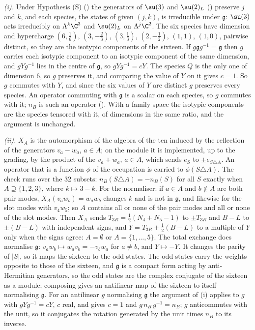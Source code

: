 \emph{(i).} Under Hypothesis (S) () the generators of $\su(3)$ and $\su(2)_{L}$ () preserve $j$ and $k$, and each species, the states of given $(j, k)$, is irreducible under $\mathfrak{g}$: $\su(3)$ acts irreducibly on $\Lambda^{k}\C^{3}$ and $\su(2)_{L}$ on $\Lambda^{j}\C^{2}$. The six species have dimension and hypercharge $(6, \tfrac16)$, $(3, -\tfrac23)$, $(3, \tfrac13)$, $(2, -\tfrac12)$, $(1, 1)$, $(1, 0)$, pairwise distinct, so they are the isotypic components of the sixteen. If $g\mathfrak{g}g^{-1} = \mathfrak{g}$ then $g$ carries each isotypic component to an isotypic component of the same dimension, and $gYg^{-1}$ lies in the centre of $\mathfrak{g}$, so $gYg^{-1} = cY$. The species $Q$ is the only one of dimension $6$, so $g$ preserves it, and comparing the value of $Y$ on it gives $c = 1$. So $g$ commutes with $Y$, and since the six values of $Y$ are distinct $g$ preserves every species. An operator commuting with $\mathfrak{g}$ is a scalar on each species, so $g$ commutes with it; $n_{B}$ is such an operator (). With a family space the isotypic components are the species tensored with it, of dimensions in the same ratio, and the argument is unchanged.

\emph{(ii).} $X_{A}$ is the automorphism of the algebra of the ten induced by the reflection of the generators $v_{a} - w_{a}$, $a \in A$; on the module it is implemented, up to the grading, by the product of the $v_{a} + w_{a}$, $a \in A$, which sends $e_{S}$ to $\pm e_{S \triangle A}$. An operator that is a function $\phi$ of the occupation is carried to $\phi(S \triangle A)$. The check runs over the $32$ subsets: $n_{B}(S \triangle A) = -n_{B}(S)$ for all $S$ exactly when $A \supseteq \{1, 2, 3\}$, where $k \mapsto 3 - k$. For the normaliser: if $a \in A$ and $b \notin A$ are both pair modes, $X_{A}(v_{a}w_{b}) = w_{a}w_{b}$ changes $k$ and is not in $\mathfrak{g}$, and likewise for the slot modes with $v_{4}w_{5}$; so $A$ contains all or none of the pair modes and all or none of the slot modes. Then $X_{A}$ sends $T_{3R} = \tfrac12(N_{4} + N_{5} - 1)$ to $\pm T_{3R}$ and $B - L$ to $\pm(B - L)$ with independent signs, and $Y = T_{3R} + \tfrac12(B - L)$ to a multiple of $Y$ only when the signs agree: $A = \emptyset$ or $A = \{1, \dots, 5\}$. The total exchange does normalise $\mathfrak{g}$: $v_{a}w_{b} \mapsto w_{a}v_{b} = -v_{b}w_{a}$ for $a \neq b$, and $Y \mapsto -Y$. It changes the parity of $|S|$, so it maps the sixteen to the odd states. The odd states carry the weights opposite to those of the sixteen, and $\mathfrak{g}$ is a compact form acting by anti-Hermitian generators, so the odd states are the complex conjugate of the sixteen as a module; composing gives an antilinear map of the sixteen to itself normalising $\mathfrak{g}$. For an antilinear $g$ normalising $\mathfrak{g}$ the argument of (i) applies to $g$ with $gYg^{-1} = cY$, $c$ real, and gives $c = 1$ and $g\,n_{B}\,g^{-1} = n_{B}$; $g$ anticommutes with the unit, so it conjugates the rotation generated by the unit times $n_{B}$ to its inverse.

